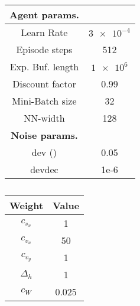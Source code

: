 {\begin{table}
{\begin{tabular}{| c | c |}
		\hline
		\textbf{Agent params.} &  \\ [0.5ex] 
		\hline
		
		Learn Rate & $\num{3e-4}$ \\
		
		Episode steps & 512 \\
		
		Exp. Buf. length & $\num{1e6}$ \\
		
		Discount factor &  0.99 \\
		
		Mini-Batch size & 32 \\
		
		NN-width & 128 \\
		
		\hline
		\textbf{Noise params.} &  \\ [0.5ex] 
		\hline
		
		dev (\textsigma) & 0.05 \\
		
		devdec & 1e-6 \\
		
		\hline
		\end{tabular}
		\caption[PPO agent parameters]{}
		\label{table:PPO parameters}
	}
\end{table}
}

{\def\arraystretch{1.4}\tabcolsep=5pt
\begin{table}
	\centering
	\begin{tabular}{| c | c |}
		\hline
		\textbf{Weight} & \textbf{Value}\\
		\hline
		\hline
		$c_{s_x}$   		&  1	\\
		$c_{v_x}$   	    &  50	\\
	  	$c_{v_y}$  		    &  1	\\
	  	$\Delta_h$  		&  1	\\
	  	$c_W$ 				&  0.025\\
		\hline
	\end{tabular}
	\caption[Reward weights]{}
	\label{table: Reward weights}
\end{table}
}


